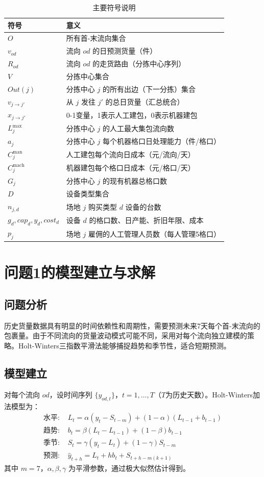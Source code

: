 \documentclass[12pt,a4paper]{ctexart}
\begin{document}
\begin{table}[H]
\centering
\caption{主要符号说明}
\begin{tabular}{ll}
\toprule
符号 & 意义 \\
\midrule
$O$ & 所有首-末流向集合 \\
$v_{od}$ & 流向 $od$ 的日预测货量（件） \\
$R_{od}$ & 流向 $od$ 的走货路由（分拣中心序列） \\
$V$ & 分拣中心集合 \\
$Out(j)$ & 分拣中心 $j$ 的所有出边（下一分拣）集合 \\
$v_{j\to j'}$ & 从 $j$ 发往 $j'$ 的总日货量（汇总统合） \\
$x_{j\to j'}$ & 0-1变量，1表示人工建包，0表示机器建包 \\
$L_j^{\max}$ & 分拣中心 $j$ 的人工最大集包流向数 \\
$a_j$ & 分拣中心 $j$ 每个机器格口日处理能力（件/格口） \\
$C_j^{\text{man}}$ & 人工建包每个流向日成本（元/流向/天） \\
$C_j^{\text{mach}}$ & 机器建包每个格口日成本（元/格口/天） \\
$G_j$ & 分拣中心 $j$ 的现有机器总格口数 \\
$D$ & 设备类型集合 \\
$n_{j,d}$ & 场地 $j$ 购买类型 $d$ 设备的台数 \\
$g_d, cap_d, y_d, cost_d$ & 设备 $d$ 的格口数、日产能、折旧年限、成本 \\
$p_j$ & 场地 $j$ 雇佣的人工管理人员数（每人管理5格口） \\
\bottomrule
\end{tabular}
\end{table}

\section{问题1的模型建立与求解}

\subsection{问题分析}
历史货量数据具有明显的时间依赖性和周期性，需要预测未来7天每个首-末流向的包裹量。由于不同流向的货量波动模式可能不同，采用对每个流向独立建模的策略。Holt-Winters三指数平滑法能够捕捉趋势和季节性，适合短期预测。

\subsection{模型建立}
对每个流向 $od$，设时间序列 $\{y_{od,t}\}$，$t=1,\dots,T$（$T$为历史天数）。Holt-Winters加法模型为：
\begin{align}
    \text{水平: } & L_t = \alpha (y_t - S_{t-m}) + (1-\alpha)(L_{t-1}+b_{t-1}) \\
    \text{趋势: } & b_t = \beta (L_t - L_{t-1}) + (1-\beta)b_{t-1} \\
    \text{季节: } & S_t = \gamma (y_t - L_t) + (1-\gamma)S_{t-m} \\
    \text{预测: } & \hat{y}_{t+h} = L_t + h b_t + S_{t+h-m(k+1)}
\end{align}
其中 $m=7$，$\alpha,\beta,\gamma$ 为平滑参数，通过极大似然估计得到。
\end{document}
